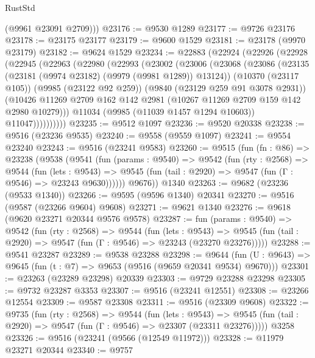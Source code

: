 \begin{lexlean}{RustStd}
\begin{coremodule}
        (@9961 @23091 @2709)))
@23176 := @9530 @1289
@23177 := @9726 @23176
@23178 := @23175 @23177
@23179 := @9600 @1529
@23181 := @23178 (@9970 @23179)
@23182 := @9624 @1529
@23234 := @22883
    (@22924
      (@22926
        (@22928
          (@22945
            (@22963
              (@22980
                (@22993
                  (@23002
                    (@23006
                      (@23068
                        (@23086
                          (@23135 (@23181 (@9974 @23182) (@9979 (@9981 @1289)) @13124))
                          (@10370 (@23117 @105))
                          (@9985 (@23122 @92 @259))
                          (@9840 (@23129 @259 @91 @3078 @2931))
                          (@10426
                            @11269
                            @2709
                            @162
                            @142
                            @2981
                            (@10267 @11269 @2709 @159 @142 @2980 @10279)))
                        @11034
                        (@9985 (@11039 @1457 @1294 @10603))
                        @11047))))))))))
@23235 := @9512 @1097
@23236 := @9520 @20338
@23238 := @9516 (@23236 @9535)
@23240 := @9558 (@9559 @1097)
@23241 := @9554 @23240
@23243 := @9516 (@23241 @9583)
@23260 := @9515
    (fun (fn : @86) =>
    @23238
      (@9538
        (@9541
          (fun (params : @9540) =>
          @9542
            (fun (rty : @2568) =>
            @9544
              (fun (lets : @9543) =>
              @9545 (fun (tail : @2920) => @9547 (fun (Γ : @9546) => @23243 @9630))))))
        @9676))
    @1340
@23263 := @9682 (@23236 (@9533 @1340))
@23266 := @9595 (@9596 @1340) @20341
@23270 := @9516 (@9587 (@23266 @9604) @9608)
@23271 := @9621 @1340
@23276 := @9618 (@9620 @23271 @20344 @9576 @9578)
@23287 := fun (params : @9540) =>
  @9542
    (fun (rty : @2568) =>
    @9544
      (fun (lets : @9543) =>
      @9545 (fun (tail : @2920) => @9547 (fun (Γ : @9546) => @23243 (@23270 @23276)))))
@23288 := @9541 @23287
@23289 := @9538 @23288
@23298 := @9644
    (fun (U : @9643) => @9645 (fun (t : @7) => @9653 (@9516 (@9659 @20341 @9534) @9670)))
@23301 := @23263 (@23289 @23298) @20339
@23303 := @9729 @23288 @23298
@23305 := @9732 @23287 @3353
@23307 := @9516 (@23241 @12551)
@23308 := @23266 @12554
@23309 := @9587 @23308
@23311 := @9516 (@23309 @9608)
@23322 := @9735
    (fun (rty : @2568) =>
    @9544
      (fun (lets : @9543) =>
      @9545 (fun (tail : @2920) => @9547 (fun (Γ : @9546) => @23307 (@23311 @23276)))))
    @3258
@23326 := @9516 (@23241 (@9566 (@12549 @11972)))
@23328 := @11979 @23271 @20344
@23340 := @9757

\end{coremodule}
\end{lexlean}
